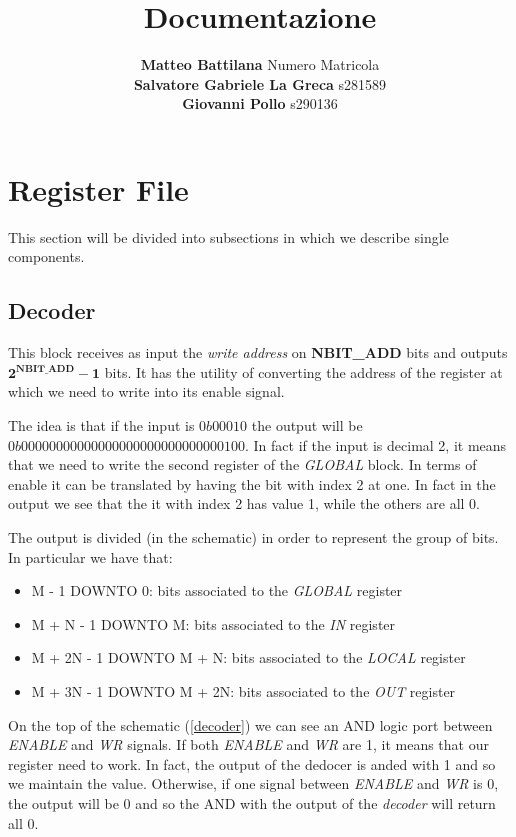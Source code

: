 \documentclass{article}
\title{\huge Documentazione}
\author{
\Large \textbf{Matteo Battilana} Numero Matricola \\
\Large \textbf{Salvatore Gabriele La Greca} s281589 \\
\Large \textbf{Giovanni Pollo} s290136}
\date{}
\begin{document}
\begin{titlepage}
  \centering
  \vspace{2px}
\end{titlepage}
\maketitle
\thispagestyle{empty}

\newpage

\tableofcontents

\newpage

\section{Register File}

This section will be divided into subsections in which we describe single components.

\subsection{Decoder}

This block receives as input the \emph{write address} on \textbf{NBIT\_ADD} bits and outputs \(\mathbf{2^{NBIT\_ADD} - 1} \) bits. It has the utility of converting the address of the register at which we need to write into its enable signal. 

The idea is that if the input is \(0b00010\) the output will be \(0b00000000000000000000000000000100\). In fact if the input is decimal 2, it means that we need to write the second register of the \emph{GLOBAL} block. In terms of enable it can be translated by having the bit with index 2 at one. In fact in the output we see that the it with index 2 has value 1, while the others are all 0. 

The output is divided (in the schematic) in order to represent the group of bits. In particular we have that: 
\begin{itemize}
    \item M - 1 DOWNTO 0: bits associated to the \emph{GLOBAL} register
    \item M + N - 1 DOWNTO M: bits associated to the \emph{IN} register
    \item M + 2N - 1 DOWNTO M + N: bits associated to the \emph{LOCAL} register
    \item M + 3N - 1 DOWNTO M + 2N: bits associated to the \emph{OUT} register
\end{itemize}

On the top of the schematic (\autoref{decoder}) we can see an AND logic port between \emph{ENABLE} and \emph{WR} signals. If both \emph{ENABLE} and \emph{WR} are 1, it means that our register need to work. In fact, the output of the dedocer is anded with 1 and so we maintain the value. Otherwise, if one signal between \emph{ENABLE} and \emph{WR} is 0, the output will be 0 and so the AND with the output of the \emph{decoder} will return all 0. 
\end{document}
